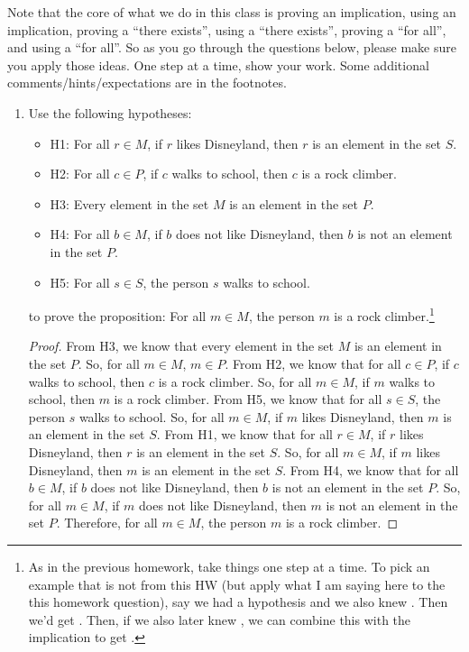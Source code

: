 \documentclass{article}
\begin{document}
\noindent Note that the core of what we do in this class is proving an implication, using an implication, proving a ``there exists'', using a ``there exists'', proving a ``for all'', and using a ``for all''. So as you go through the questions below, please make sure you apply those ideas. One step at a time, show your work. Some additional comments/hints/expectations are in the footnotes.
\begin{enumerate}

      \item Use the following hypotheses:
            \begin{itemize}
                  \item H1: For all $r \in M$, if $r$ likes Disneyland, then $r$ is an element in the
                        set $S$.
                  \item H2: For all $c \in P$, if $c$ walks to school, then $c$ is a rock climber.
                  \item H3: Every element in the set $M$ is an element in the set $P$.
                  \item H4: For all $b \in M$, if $b$ does not like Disneyland, then $b$ is not an
                        element in the set $P$.
                  \item H5: For all $s \in S$, the person $s$ walks to school.
            \end{itemize}
            to prove the proposition: For all $m \in M$, the person $m$ is a rock climber.\footnote{As in the previous homework, take things one step at a time. To pick an example that is not from this HW (but apply what I am saying here to the this homework question), say we had a hypothesis  and we also knew . Then we'd get . Then, if we also later knew , we can combine this with the implication to get .}

            \begin{proof}
                  From H3, we know that every element in the set $M$ is an element in the set $P$. So, for all $m \in M$, $m \in P$.
                  From H2, we know that for all $c \in P$, if $c$ walks to school, then $c$ is a rock climber. So, for all $m \in M$, if $m$ walks to school, then $m$ is a rock climber.
                  From H5, we know that for all $s \in S$, the person $s$ walks to school. So, for all $m \in M$, if $m$ likes Disneyland, then $m$ is an element in the set $S$.
                  From H1, we know that for all $r \in M$, if $r$ likes Disneyland, then $r$ is an element in the set $S$. So, for all $m \in M$, if $m$ likes Disneyland, then $m$ is an element in the set $S$.
                  From H4, we know that for all $b \in M$, if $b$ does not like Disneyland, then $b$ is not an element in the set $P$. So, for all $m \in M$, if $m$ does not like Disneyland, then $m$ is not an element in the set $P$.
                  Therefore, for all $m \in M$, the person $m$ is a rock climber.
            \end{proof}


\end{enumerate}
\end{document}
